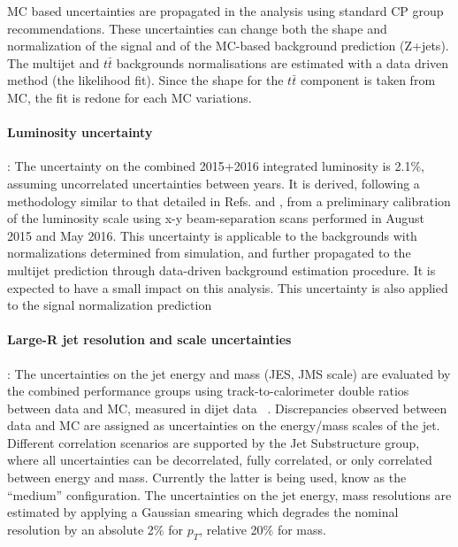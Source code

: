 MC based uncertainties are propagated in the analysis using standard CP group recommendations. These uncertainties can change both the shape and normalization of the signal and of the MC-based background prediction (Z+jets). The multijet and $t\bar{t}$ backgrounds normalisations are estimated with a data driven method (the likelihood fit). Since the shape for the $t\bar{t}$ component is taken from MC, the fit is redone for each MC variations.

\paragraph{Luminosity uncertainty}: The uncertainty on the combined 2015+2016 integrated luminosity is 2.1\%, assuming uncorrelated uncertainties between years. It is derived, following a methodology similar to that detailed in Refs. \cite{Aad:2013ucp} and \cite{ATLASlumi8TeV}, from a preliminary calibration of the luminosity scale using x-y beam-separation scans performed in August 2015 and May 2016. This uncertainty is applicable to the backgrounds with normalizations determined from simulation, and further propagated to the multijet prediction through data-driven background estimation procedure. It is expected to have a small impact on this analysis. This uncertainty is also applied to the signal normalization prediction

\paragraph{Large-R jet resolution and scale uncertainties}:
 The uncertainties on the jet energy and mass  (JES, JMS scale) are evaluated by the combined performance groups using track-to-calorimeter double ratios between data and MC, measured in dijet data~\cite{Aad:2013gja,BosonTagPreRec} . Discrepancies observed between data and MC are assigned as uncertainties on the energy/mass scales of the jet. Different correlation scenarios are supported by the Jet Substructure group, where all uncertainties can be decorrelated, fully correlated, or only correlated between energy and mass. Currently the latter is being used, know as the ``medium'' configuration.
The uncertainties on the jet energy, mass resolutions are estimated by applying a Gaussian smearing which degrades the nominal resolution by an absolute 2\% for $p_{T}$, relative 20\% for mass.

